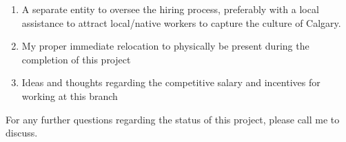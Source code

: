 \documentclass{article}
\begin{document}
\begin{enumerate}
\item A separate entity to oversee the hiring process, preferably with a local assistance to attract local/native workers to capture the culture of Calgary.
\item My proper immediate relocation to physically be present during the completion of this project
\item Ideas and thoughts regarding the competitive salary and incentives for working at this branch
\end{enumerate}

For any further questions regarding the status of this project, please call me to discuss.
\end{document}
